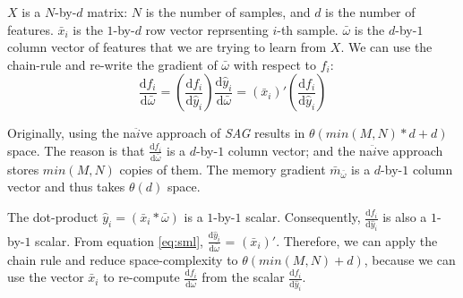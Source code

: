$X$ is a $N$-by-$d$ matrix: $N$ is the number of samples, and $d$ is the number of features.  
$\bar{x}_{i}$ is the $1$-by-$d$ row vector reprsenting $i$-th sample.
$\bar{\omega}$ is the $d$-by-$1$ column vector of features that we are trying to learn from $X$.
We can use the chain-rule and re-write the gradient of $\bar{\omega}$ with respect to $f_{i}$:
\begin{equation} \label{eq:chainsml}
\frac{\text{d}f_{i}}{\text{d}\bar{\omega}} = \left(\frac{\text{d}f_{i}}{\text{d}\hat{y}_{i}}\right)\frac{\text{d}\hat{y}_{i}}{\text{d}\bar{\omega}} = \left(\bar{x}_{i}\right)'\left(\frac{\text{d}f_{i}}{\text{d}\hat{y}_{i}}\right)
\end{equation}

Originally, using the na$\ddot{i}$ve approach of \emph{SAG} results in $\theta(min(M,N)*d+d)$ space.
The reason is that $\frac{\text{d}f_{i}}{\text{d}\bar{\omega}}$ is a $d$-by-$1$ column vector; and the na$\ddot{i}$ve approach stores $min(M,N)$ copies of them.  
The memory gradient $\bar{m}_{\bar{\omega}}$ is a $d$-by-$1$ column vector and thus takes $\theta(d)$ space.

The dot-product $\hat{y}_{i} = \left(\bar{x}_{i}*\bar{\omega}\right)$ is a $1$-by-$1$ scalar.  
Consequently, $\frac{\text{d}f_{i}}{\text{d}\hat{y}_{i}}$ is also a $1$-by-$1$ scalar.  
From equation \ref{eq:sml}, $\frac{\text{d}\hat{y}_{i}}{\text{d}\bar{\omega}}$ = $\left(\bar{x}_i\right)'$.
Therefore, we can apply the chain rule and reduce space-complexity to $\theta(min(M,N)+d)$, because we can use the vector $\bar{x}_{i}$ to re-compute $\frac{\text{d}f_{i}}{\text{d}\bar{\omega}}$ from the scalar $\frac{\text{d}f_{i}}{\text{d}\hat{y}_{i}}$.


